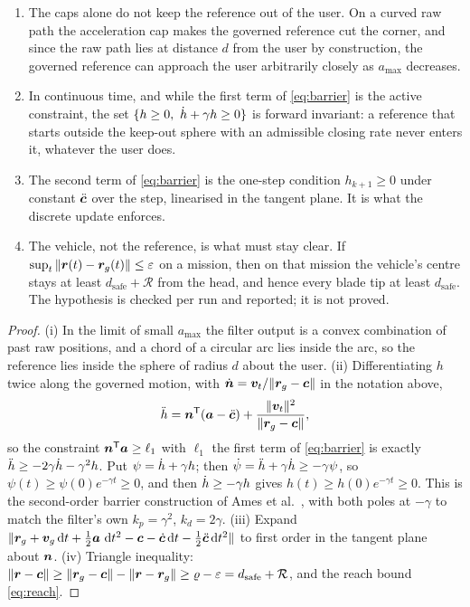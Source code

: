 \begin{proposition}
\label{prop:governor}
\begin{enumerate}[label=(\roman*),nosep]
  \item The caps alone do not keep the reference out of the user. On a curved
        raw path the acceleration cap makes the governed reference cut the
        corner, and since the raw path lies at distance $d$ from the user by
        construction, the governed reference can approach the user
        arbitrarily closely as $a_{\max}$ decreases.
  \item In continuous time, and while the first term of \cref{eq:barrier} is
        the active constraint, the set
        $\{h\ge0,\ \dot{h}+\gamma h\ge0\}$ is forward invariant: a reference
        that starts outside the keep-out sphere with an admissible closing
        rate never enters it, whatever the user does.
  \item The second term of \cref{eq:barrier} is the one-step condition
        $h_{k+1}\ge0$ under constant $\ddot{\bm{c}}$ over the step, linearised
        in the tangent plane. It is what the discrete update enforces.
  \item The vehicle, not the reference, is what must stay clear. If
        $\sup_t\|\bm{r}(t)-\bm{r}_g(t)\|\le\varepsilon$ on a mission, then on
        that mission the vehicle's centre stays at least
        $d_{\mathrm{safe}}+\mathcal{R}$ from the head, and hence every blade tip
        at least $d_{\mathrm{safe}}$. The hypothesis is checked per run and
        reported; it is not proved.
\end{enumerate}
\end{proposition}

\begin{proof}
(i) In the limit of small $a_{\max}$ the filter output is a convex combination
of past raw positions, and a chord of a circular arc lies inside the arc, so
the reference lies inside the sphere of radius $d$ about the user.
(ii) Differentiating $h$ twice along the governed motion, with
$\dot{\bm{n}} = \bm{v}_t/\|\bm{r}_g-\bm{c}\|$ in the notation above,
\[
  \ddot{h} = \bm{n}^{\mathsf{T}}(\bm{a}-\ddot{\bm{c}})
           + \frac{\|\bm{v}_t\|^2}{\|\bm{r}_g-\bm{c}\|} ,
\]
so the constraint $\bm{n}^{\mathsf{T}}\bm{a}\ge\ell_1$ with $\ell_1$ the first
term of \cref{eq:barrier} is exactly $\ddot{h}\ge-2\gamma\dot{h}-\gamma^2 h$. Put
$\psi=\dot{h}+\gamma h$; then $\dot{\psi} = \ddot{h}+\gamma\dot{h}\ge-\gamma\psi$, so
$\psi(t)\ge\psi(0)e^{-\gamma t}\ge0$, and then
$\dot{h}\ge-\gamma h$ gives $h(t)\ge h(0)e^{-\gamma t}\ge0$. This is the
second-order barrier construction of Ames et al.~\cite{ames2017}, with both
poles at $-\gamma$ to match the filter's own $k_p=\gamma^2$, $k_d=2\gamma$.
(iii) Expand $\|\bm{r}_g+\bm{v}_g\,\mathrm{d} t+\tfrac12\bm{a}\,\,\mathrm{d} t^2 -
\bm{c}-\dot{\bm{c}}\,\mathrm{d} t-\tfrac12\ddot{\bm{c}}\,\mathrm{d} t^2\|$ to first order in the
tangent plane about $\bm{n}$. (iv) Triangle inequality:
$\|\bm{r}-\bm{c}\|\ge\|\bm{r}_g-\bm{c}\|-\|\bm{r}-\bm{r}_g\|
\ge\varrho-\varepsilon = d_{\mathrm{safe}}+\mathcal{R}$, and the reach bound
\cref{eq:reach}.
\end{proof}


